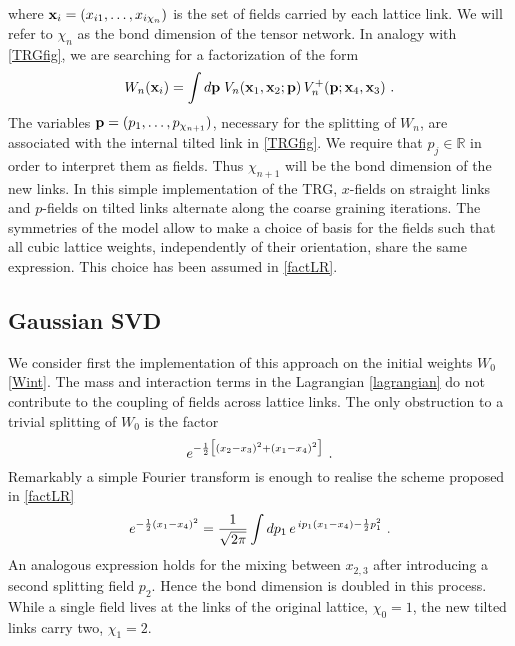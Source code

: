 \documentclass[a4paper,preprintnumbers,nofootinbib,twocolumn]{quantumarticle}
\newcommand{\be}{\begin{equation}} \newcommand{\ee}{\end{equation}}
\begin{document}
\noindent where ${\bf x}_i=(x_{i1},\dots, x_{i \chi_n})$ is the set of fields carried by each lattice link. We will
refer to $\chi_n$ as the bond dimension of the tensor network.
In analogy with \eqref{TRGfig}, we are searching for a factorization of the form
\be
W_n({\bf x}_i) = \int d {\bf p} \; V_{n}({\bf x}_1 ,{\bf x}_2;{\bf p}) \, V_{n}^+ ({\bf p};{\bf x}_4,{\bf x}_3) \ .
\label{factLR}
\ee
The variables ${\bf p}=(p_{1},\dots, p_{\chi_{n+1}})$, necessary for the splitting of $W_n$, are associated with the internal tilted link in  \eqref{TRGfig}.
We require that $p_j \in \mathbb{R}$ in order to interpret them as fields. Thus $\chi_{n+1}$ will be the bond dimension of the new links.
In this simple implementation of the TRG, $x$-fields on straight links and $p$-fields on tilted links alternate along the coarse graining iterations.
The symmetries of the model allow to make a choice of basis for the fields such that all cubic 
lattice
weights, independently of their orientation, share the same expression.
This choice has been assumed in \eqref{factLR}.

\subsection{Gaussian SVD}

We consider first the implementation of this approach on %
the initial weights $W_0$ \eqref{Wint}. 
The mass and interaction terms in the Lagrangian \eqref{lagrangian} do not contribute to the coupling of fields across lattice links. 
The only obstruction to a trivial splitting of $W_0$ is the factor
\be
e^{-{1 \over 2} \big[ (x_2-x_3)^2 + (x_1-x_4)^2 \big]} \ .
\label{mix0}
\ee
Remarkably a simple Fourier transform is enough to realise the scheme proposed in \eqref{factLR}
\be
e^{-{1 \over 2} (x_1-x_4)^2 } = {1 \over \sqrt{2 \pi}} \int d p_1 \, e^{\, i p_1 (x_1 -x_4) -{1 \over 2} p_1^2} \ .
\label{fourier}
\ee
An analogous expression holds for the mixing between $x_{2,3}$ after introducing a second splitting field $p_2$. Hence the bond dimension is doubled in this process. 
While a single field lives at the links of the original lattice, $\chi_0=1$, the new tilted links carry  two, $\chi_1=2$. 
\end{document}
